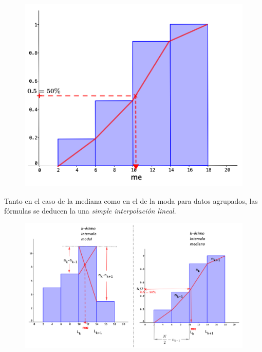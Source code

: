 	\begin{figure}[H]
			\centering
			\includegraphics[width=.75\textwidth]{imagenes/imagenes01/T01IM09.png}
		\end{figure}

Tanto en el caso de la mediana como en el de la moda para datos agrupados, las fórmulas se deducen la una \emph{simple interpolación lineal}.


\begin{figure}[H]
			\centering
			\includegraphics[width=1.05\textwidth]{imagenes/imagenes01/T01IM10.png}
		\end{figure}



